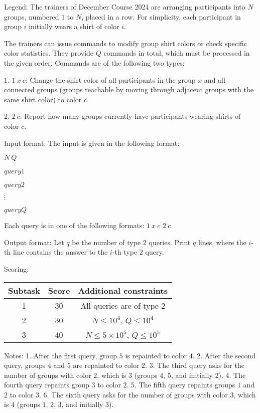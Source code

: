 Legend:  
The trainers of December Course 2024 are arranging participants into $N$ groups, numbered $1$ to $N$, placed in a row. For simplicity, each participant in group $i$ initially wears a shirt of color $i$.  

The trainers can issue commands to modify group shirt colors or check specific color statistics. They provide $Q$ commands in total, which must be processed in the given order. Commands are of the following two types:  

1. $1\ x\ c$: Change the shirt color of all participants in the group $x$ and all connected groups (groups reachable by moving through adjacent groups with the same shirt color) to color $c$.  

2. $2\ c$: Report how many groups currently have participants wearing shirts of color $c$.  

Input format:  
The input is given in the following format:  

$N\ Q$  

$query1$  

$query2$  

$\vdots$  

$queryQ$  

Each query is in one of the following formats:  
$1\ x\ c$  
$2\ c$  

Output format:  
Let $q$ be the number of type $2$ queries. Print $q$ lines, where the $i$-th line contains the answer to the $i$-th type $2$ query.  

Scoring:
\begin{table}[h!]
    \begin{center}
        \begin{tabular}{|c|c|c|} 
            \hline
            \textbf{Subtask} & \textbf{Score} & \textbf{Additional constraints} \\
            \hline
            1 & 30 & All queries are of type $2$ \\
            \hline
            2 & 30 & $N \leq 10^4$, $Q \leq 10^4$ \\
            \hline
            3 & 40 & $N \leq 5 \times 10^5$, $Q \leq 10^5$ \\
            \hline
        \end{tabular}
    \end{center}
\end{table}


Notes:  
1. After the first query, group $5$ is repainted to color $4$.  
2. After the second query, groups $4$ and $5$ are repainted to color $2$.  
3. The third query asks for the number of groups with color $2$, which is $3$ (groups $4$, $5$, and initially $2$).  
4. The fourth query repaints group $3$ to color $2$.  
5. The fifth query repaints groups $1$ and $2$ to color $3$.  
6. The sixth query asks for the number of groups with color $3$, which is $4$ (groups $1$, $2$, $3$, and initially $3$).  